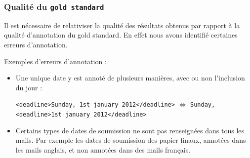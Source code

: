 \documentclass[a4paper,french,10pt]{article}
\begin{document}
\subsubsection{Qualité du \texttt{gold standard}}
Il est nécessaire de relativiser la qualité des résultats obtenus par rapport à la qualité d'annotation du gold standard. En effet nous avons identifié certaines erreurs d'annotation.

Exemples d'erreurs d'annotation :
\begin{itemize}
\item Une unique date y est annoté de plusieurs manières, avec ou non l'inclusion du jour :

\texttt{<deadline>Sunday, 1st january 2012</deadline>} $\Leftrightarrow$ \texttt{Sunday, <deadline>1st january 2012</deadline>}

\item Certains types de dates de soumission ne sont pas renseignées dans tous les mails. Par exemple les dates de soumission des papier finaux, annotées dans les mails anglais, et non annotées dans des mails français.
\end{itemize}
\end{document}
